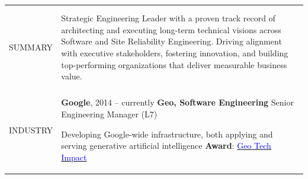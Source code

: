 \documentclass[letterpaper,10pt,oneside]{article}
\newcommand{\DatestampY}[1]{#1}
\newcommand{\itemspacing}{\vspace{0.12cm}}
\newcommand{\sref}[2]{%
    \href{https://0/local/attachments/#1}{\textcolor{blue}{#2}}%
}
\newenvironment{body}
{\par\par
\begin{longtable}{p{0.145\textwidth}p{0.81\textwidth}}
\endfirsthead
\noalign{\vspace{0.4cm}}
\endhead}
{\par\end{longtable}\par}
\renewcommand{\section}[3]{\\[-0.28cm]\pdfbookmark[2]{#2}{#3}\\%
\raggedleft  %
{\fontsize{9.5pt}{9.5pt}\selectfont\bfseries\raggedright%
\MakeUppercase{#1}}&}
\begin{document}
\begin{body}


\section{Summary}{Summary}{PDF:Summary}

Strategic Engineering Leader with a proven track record of architecting and executing long-term technical visions across Software and Site Reliability Engineering. Driving alignment with executive stakeholders, fostering innovation, and building top-performing organizations that deliver measurable business value.




\section{Industry}{Industry}{PDF:Industry}

\textbf{Google}, \DatestampY{2014} -- currently \vspace{0.06cm} \newline
\phantom{g}\textbf{Geo, Software Engineering} \textemdash{ }Senior Engineering Manager (L7)
\begin{comp}
\item Developing Google-wide infrastructure, both applying and serving generative artificial intelligence \newline\textbf{Award}: \sref{Google-Award-GeoTechImpact-2026.pdf}{Geo Tech Impact}
\end{comp}
\itemspacing


\end{body}
\end{document}
